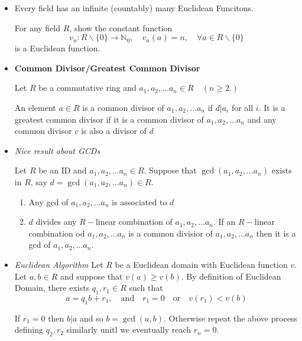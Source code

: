 \documentclass[a4paper, 12pt]
{article}
\newcommand{\nonzeroset}[1]{#1 \backslash \{0\}}
\newcommand{\setwithzero}[1]{#1_{0}}
\newcommand{\letter}[1]{$#1$}
\newcommand{\seq}[2]{#1_{1}, #1_{2}, \ldots #1_{#2}}
\begin{document}
\begin{itemize}
		\item Every field has an infinite (countably) many Euclidean Funcitons.
		
		For any field \letter{R}, show the constant function 
		$$v_n: \nonzeroset{R} \rightarrow \setwithzero{\mathbb{N}}, \quad v_n(a)=n, \quad \forall a\in \nonzeroset{R}$$
		is a Euclidean function.
		
		\item \textbf{Common Divisor/Greatest Common Divisor}
		
		Let \letter{R} be a commutative ring and $\seq{a}{n} \in R \quad (n \geq 2.)$
		
		An element $a \in R$ is a common divisor of $\seq{a}{n}$ if $d | a_i$ for all $i.$ It is a greatest common divisor if it is a common divisor of $\seq{a}{n}$ and any common divisor $c$ is also a divisor of $d$ 
		
		\item \textit{Nice result about GCDs} 
		
		Let \letter{R} be an ID and $\seq{a}{n} \in R.$ Suppose that $\gcd(\seq{a}{n})$ exists in \letter{R}, say $d =\gcd(\seq{a}{n}) \in R.$
		
	\begin{enumerate}[label=(\roman*)]
		\item  Any gcd of $\seq{a}{n}$ is associated to \letter{d}
		\item \letter{d} divides any $R-$linear combination of $\seq{a}{n}.$ If an $R-$linear combination od $\seq{a}{n}$ is a common divisior of $\seq{a}{n}$ then it is a gcd of $\seq{a}{n}.$
	\end{enumerate}
	
	\item \textit{Euclidean Algorithm} Let \letter{R} be a Euclidean domain with Euclidean function \letter{v}. Let $a,b\in R$ and suppose that $v(a) \geq v(b).$ By definition of Euclidean Domain, there exists $q_1, r_1 \in R$ such that 
	$$a=q_1b+r_1, \quad \text{and} \quad r_1=0 \quad \text{or} \quad v(r_1)<v(b)$$
	
	If $r_1=0$ then $b|a$ and so $b=\gcd(a,b).$ Otherwise repeat the above process defining $q_2, r_2$ similarly unitl we eventually reach $r_n=0.$
	\end{itemize}

	
	
\end{document}
